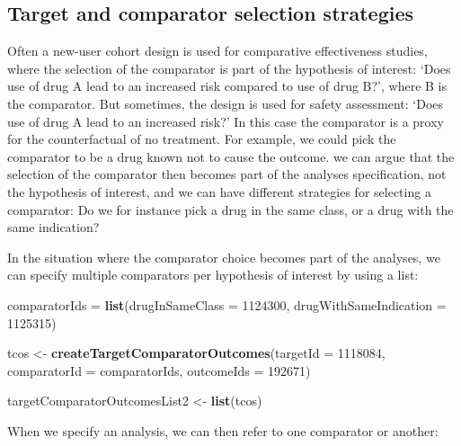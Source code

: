 \documentclass[
]{article}
\newenvironment{Shaded}{\begin{snugshade}}{\end{snugshade}}
\newcommand{\DataTypeTok}[1]{\textcolor[rgb]{0.13,0.29,0.53}{#1}}
\newcommand{\DecValTok}[1]{\textcolor[rgb]{0.00,0.00,0.81}{#1}}
\newcommand{\KeywordTok}[1]{\textcolor[rgb]{0.13,0.29,0.53}{\textbf{#1}}}
\newcommand{\NormalTok}[1]{#1}
\newcommand{\StringTok}[1]{\textcolor[rgb]{0.31,0.60,0.02}{#1}}
\begin{document}
\hypertarget{target-and-comparator-selection-strategies}{%
\subsection{Target and comparator selection
strategies}\label{target-and-comparator-selection-strategies}}

Often a new-user cohort design is used for comparative effectiveness
studies, where the selection of the comparator is part of the hypothesis
of interest: `Does use of drug A lead to an increased risk compared to
use of drug B?', where B is the comparator. But sometimes, the design is
used for safety assessment: `Does use of drug A lead to an increased
risk?' In this case the comparator is a proxy for the counterfactual of
no treatment. For example, we could pick the comparator to be a drug
known not to cause the outcome. we can argue that the selection of the
comparator then becomes part of the analyses specification, not the
hypothesis of interest, and we can have different strategies for
selecting a comparator: Do we for instance pick a drug in the same
class, or a drug with the same indication?

In the situation where the comparator choice becomes part of the
analyses, we can specify multiple comparators per hypothesis of interest
by using a list:

\begin{Shaded}
\begin{Highlighting}[]
\NormalTok{comparatorIds =}\StringTok{ }\KeywordTok{list}\NormalTok{(}\DataTypeTok{drugInSameClass =} \DecValTok{1124300}\NormalTok{,}
                     \DataTypeTok{drugWithSameIndication =} \DecValTok{1125315}\NormalTok{)}

\NormalTok{tcos <-}\StringTok{ }\KeywordTok{createTargetComparatorOutcomes}\NormalTok{(}\DataTypeTok{targetId =} \DecValTok{1118084}\NormalTok{,}
                                     \DataTypeTok{comparatorId =}\NormalTok{ comparatorIds,}
                                     \DataTypeTok{outcomeIds =} \DecValTok{192671}\NormalTok{)}

\NormalTok{targetComparatorOutcomesList2 <-}\StringTok{ }\KeywordTok{list}\NormalTok{(tcos)}
\end{Highlighting}
\end{Shaded}

When we specify an analysis, we can then refer to one comparator or
another:
\end{document}
